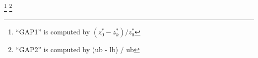 \documentclass[11pt]{article}
\newcommand{\RR}{\mathbb{R}}
\begin{document}
\begin{table}
	\label{tab:addlabel}%
	\footnote{``GAP1'' is computed by $(z_0^* - z_k^*) / z_0^*$}
	\footnote{``GAP2'' is computed by (ub - lb) / ub}
\end{table}%


%
\end{document}
